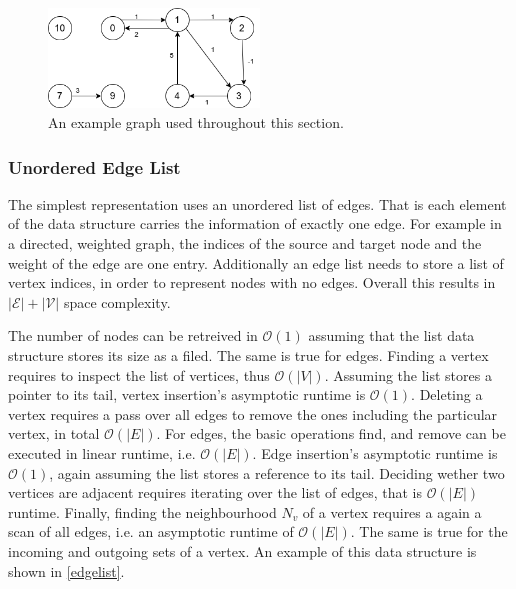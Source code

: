         \begin{figure}[htp]
            \begin{center}
                \includegraphics[keepaspectratio,width=0.5\textwidth]{img/03-preliminaries/data_struct_gr.png}
            \end{center}
            \caption{An example graph used throughout this section.} 
            \label{data_struct-ex}
        \end{figure}
        
        \subsubsection*{Unordered Edge List}
        The simplest representation uses an unordered list of edges. 
        That is each element of the data structure carries the information of exactly one edge. 
        For example in a directed, weighted graph, the indices of the source and target node and the weight of the edge are one entry. 
        Additionally an edge list needs to store a list of vertex indices, in order to represent nodes with no edges.
        Overall this results in $\mathcal{|E| + |V|}$ space complexity.
        
        The number of nodes can be retreived in $\mathcal{O}(1)$ assuming that the list data structure stores its size as a filed. 
        The same is true for edges.
        Finding a vertex requires to inspect the list of vertices, thus $\mathcal{O}(|V|)$. 
        Assuming the list stores a pointer to its tail, vertex insertion's asymptotic runtime is $\mathcal{O}(1)$. 
        Deleting a vertex requires a pass over all edges to remove the ones including the particular vertex, in total $\mathcal{O}(|E|)$.
        For edges, the basic operations find, and remove can be executed in linear runtime, i.e. $\mathcal{O}(|E|)$.
        Edge insertion's asymptotic runtime is $\mathcal{O}(1)$, again assuming the list stores a reference to its tail. 
        Deciding wether two vertices are adjacent requires iterating over the list of edges, that is 
        $\mathcal{O}(|E|)$ runtime.
        Finally, finding the neighbourhood $N_v$ of a vertex requires a again a scan of all edges, i.e. an asymptotic runtime of $\mathcal{O}(|E|)$. 
        The same is true for the incoming and outgoing sets of a vertex.
        An example of this data structure is shown in \ref{edgelist}.
        
